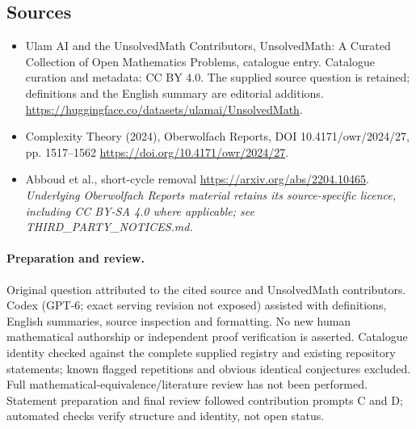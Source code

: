 \documentclass[11pt]{article}
\begin{document}
\subsection{Sources}
\begin{itemize}
\item[\hypertarget{source:statement:1}{S1}] Ulam AI and the UnsolvedMath Contributors, UnsolvedMath: A Curated Collection of Open Mathematics Problems, catalogue entry. Catalogue curation and metadata: CC BY 4.0. The supplied source question is retained; definitions and the English summary are editorial additions.
\url{https://huggingface.co/datasets/ulamai/UnsolvedMath}.
\item[\hypertarget{source:statement:2}{S2}] Complexity Theory (2024), Oberwolfach Reports, DOI 10.4171/owr/2024/27, pp. 1517--1562
\url{https://doi.org/10.4171/owr/2024/27}.
\item[\hypertarget{source:statement:3}{S3}] Abboud et al., short-cycle removal
\url{https://arxiv.org/abs/2204.10465}.
\textit{Underlying Oberwolfach Reports material retains its source-specific licence, including CC BY-SA 4.0 where applicable; see THIRD\_PARTY\_NOTICES.md.}
\end{itemize}
\paragraph{Preparation and review.}
Original question attributed to the cited source and UnsolvedMath contributors. Codex (GPT-6; exact serving revision not exposed) assisted with definitions, English summaries, source inspection and formatting. No new human mathematical authorship or independent proof verification is asserted. Catalogue identity checked against the complete supplied registry and existing repository statements; known flagged repetitions and obvious identical conjectures excluded. Full mathematical-equivalence/literature review has not been performed. Statement preparation and final review followed contribution prompts C and D; automated checks verify structure and identity, not open status.
\label{end:statement}
\end{document}

